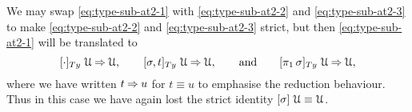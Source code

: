\documentclass[a4paper,UKenglish,numberwithinsect,cleveref,thm-restate]{lipics-v2021}
\begin{document}
We may swap \eqref{eq:type-sub-at2-1} with \eqref{eq:type-sub-at2-2} and \eqref{eq:type-sub-at2-3} to make \eqref{eq:type-sub-at2-2} and \eqref{eq:type-sub-at2-3} strict, but then \eqref{eq:type-sub-at2-1} will be translated to 
\[
[ \emptysub ]_{\Ty}\;\UU         \reduce \UU, \qquad
[ \sigma, t ]_{\Ty}\;\UU         \reduce \UU, \qquad\text{and}\qquad 
[ \pi_1\,\sigma ]_{\Ty}\;\UU     \reduce \UU,
\]
where we have written $t \mathbin{\Rightarrow} u$ for $t \equiv u$ to emphasise the reduction behaviour. Thus in this case we have again lost the strict identity $[\sigma]\;\mathcal{U} \equiv \mathcal{U}$.
%
\end{document}
